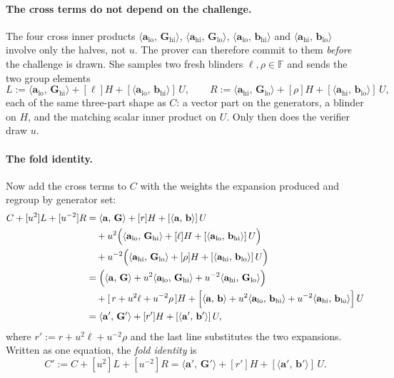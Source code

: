 \documentclass[11pt,a4paper]{article}
\theoremstyle{definition}
\newcommand{\F}{\mathbb{F}}
\newcommand{\ip}[2]{\langle #1,\, #2 \rangle}
\begin{document}
\paragraph{The cross terms do not depend on the challenge.}
The four cross inner
products $\ip{\mathbf a_{\mathrm{lo}}}{\mathbf G_{\mathrm{hi}}}$,
$\ip{\mathbf a_{\mathrm{hi}}}{\mathbf G_{\mathrm{lo}}}$,
$\ip{\mathbf a_{\mathrm{lo}}}{\mathbf b_{\mathrm{hi}}}$ and
$\ip{\mathbf a_{\mathrm{hi}}}{\mathbf b_{\mathrm{lo}}}$ involve only the
halves, not $u$. The prover can therefore commit to them \emph{before}
the challenge is drawn. She samples two fresh blinders
$\ell, \rho \in \F$ and sends the two group elements
\begin{equation}\label{eq:ipa-LR}
L := \ip{\mathbf a_{\mathrm{lo}}}{\mathbf G_{\mathrm{hi}}} + [\ell]H
   + [\ip{\mathbf a_{\mathrm{lo}}}{\mathbf b_{\mathrm{hi}}}]\,U,
\qquad
R := \ip{\mathbf a_{\mathrm{hi}}}{\mathbf G_{\mathrm{lo}}} + [\rho]H
   + [\ip{\mathbf a_{\mathrm{hi}}}{\mathbf b_{\mathrm{lo}}}]\,U,
\end{equation}
each of the same three-part shape as $C$: a vector part on the
generators, a blinder on $H$, and the matching scalar inner product on
$U$. Only then does the verifier draw $u$.

\paragraph{The fold identity.}
Now add the cross terms to $C$ with the weights the expansion produced
and regroup by generator set:
\begin{align*}
C + [u^{2}]L + [u^{-2}]R
 &= \ip{\mathbf a}{\mathbf G} + [r]H + [\ip{\mathbf a}{\mathbf b}]\,U \\
 &\quad + u^{2}\Bigl(\ip{\mathbf a_{\mathrm{lo}}}{\mathbf G_{\mathrm{hi}}}
   + [\ell]H + [\ip{\mathbf a_{\mathrm{lo}}}{\mathbf b_{\mathrm{hi}}}]\,U
   \Bigr) \\
 &\quad + u^{-2}\Bigl(\ip{\mathbf a_{\mathrm{hi}}}{\mathbf G_{\mathrm{lo}}}
   + [\rho]H + [\ip{\mathbf a_{\mathrm{hi}}}{\mathbf b_{\mathrm{lo}}}]\,U
   \Bigr) \\
 &= \Bigl(\ip{\mathbf a}{\mathbf G}
   + u^{2}\ip{\mathbf a_{\mathrm{lo}}}{\mathbf G_{\mathrm{hi}}}
   + u^{-2}\ip{\mathbf a_{\mathrm{hi}}}{\mathbf G_{\mathrm{lo}}}\Bigr) \\
 &\quad + [\,r + u^{2}\ell + u^{-2}\rho\,]H
   + \Bigl[\ip{\mathbf a}{\mathbf b}
   + u^{2}\ip{\mathbf a_{\mathrm{lo}}}{\mathbf b_{\mathrm{hi}}}
   + u^{-2}\ip{\mathbf a_{\mathrm{hi}}}{\mathbf b_{\mathrm{lo}}}\Bigr]\,U \\
 &= \ip{\mathbf a'}{\mathbf G'} + [r']H + [\ip{\mathbf a'}{\mathbf b'}]\,U,
\end{align*}
where $r' := r + u^{2}\ell + u^{-2}\rho$ and the last line substitutes
the two expansions. Written as one equation, the \emph{fold identity}
is
\begin{equation}\label{eq:ipa-fold}
C' := C + [u^{2}]L + [u^{-2}]R
 = \ip{\mathbf a'}{\mathbf G'} + [r']H + [\ip{\mathbf a'}{\mathbf b'}]\,U .
\end{equation}
\end{document}

